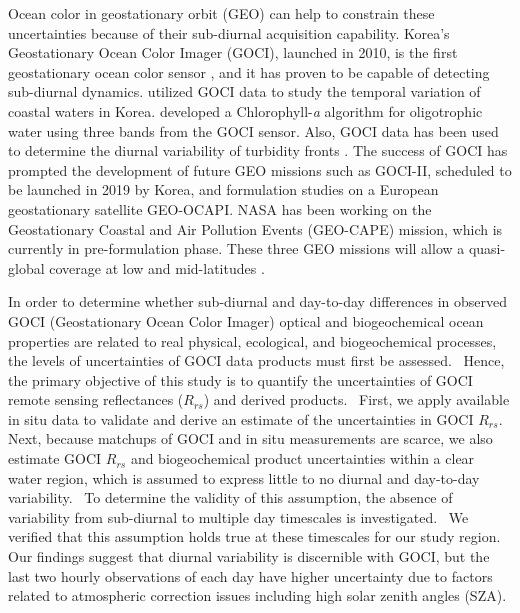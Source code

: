 \documentclass[onecolumn,3p,letterpaper,11pt]{elsarticle}
\begin{document}
Ocean color in geostationary orbit (GEO) can help to constrain these uncertainties because of their sub-diurnal acquisition capability.
Korea's Geostationary Ocean Color Imager (GOCI), launched in 2010, is the first geostationary ocean color sensor \citep{Ryu2012}, and it has proven to be capable of detecting sub-diurnal dynamics.
%
\citet{Ryu2011} utilized GOCI data to study the temporal variation of coastal waters in Korea. 
\citet{He2013} developed a Chlorophyll-{\it a} algorithm for oligotrophic water using three bands from the GOCI sensor. 
Also, GOCI data has been used to determine the diurnal variability of turbidity fronts \citep{Hu2016}.
%
The success of GOCI has prompted the development of future GEO missions such as GOCI-II, scheduled to be launched in 2019 by Korea, and formulation studies on a European geostationary satellite GEO-OCAPI.
NASA has been working on the Geostationary Coastal and Air Pollution Events (GEO-CAPE) mission, which is currently in pre-formulation phase. 
These three GEO missions will allow a quasi-global coverage at low and mid-latitudes \citep{Ruddick2014}.




In order to determine whether sub-diurnal and day-to-day differences in observed GOCI (Geostationary Ocean Color Imager) optical and biogeochemical ocean properties are related to real physical, ecological, and biogeochemical processes, the levels of uncertainties of GOCI data products must first be assessed.  
Hence, the primary objective of this study is to quantify the uncertainties of GOCI remote sensing reflectances ($R_{rs}$) and derived products.  
First, we apply available in situ data to validate and derive an estimate of the uncertainties in GOCI $R_{rs}$.  
Next, because matchups of GOCI and in situ measurements are scarce, we also estimate GOCI $R_{rs}$ and biogeochemical product uncertainties within a clear water region, which is assumed to express little to no diurnal and day-to-day variability.  
To determine the validity of this assumption, the absence of variability from sub-diurnal to multiple day timescales is investigated.  
We verified that this assumption holds true at these timescales for our study region.  Our findings suggest that diurnal variability is discernible with GOCI, but the last two hourly observations of each day have higher uncertainty due to factors related to atmospheric correction issues including high solar zenith angles (SZA).
\end{document}
